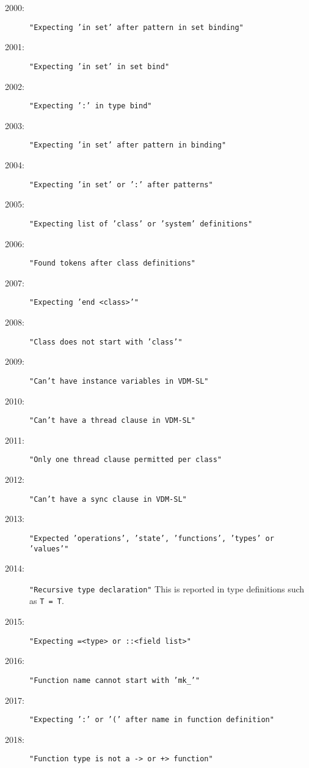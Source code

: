 %
%
%

\begin{description}
\item[2000:] \texttt{"Expecting 'in set' after pattern in set binding"}
\item[2001:] \texttt{"Expecting 'in set' in set bind"}
\item[2002:] \texttt{"Expecting ':' in type bind"}
\item[2003:] \texttt{"Expecting 'in set' after pattern in binding"}
\item[2004:] \texttt{"Expecting 'in set' or ':' after patterns"}
\item[2005:] \texttt{"Expecting list of 'class' or 'system' definitions"}
\item[2006:] \texttt{"Found tokens after class definitions"}
\item[2007:] \texttt{"Expecting 'end <class>'"}
\item[2008:] \texttt{"Class does not start with 'class'"}
\item[2009:] \texttt{"Can't have instance variables in VDM-SL"}
\item[2010:] \texttt{"Can't have a thread clause in VDM-SL"}
\item[2011:] \texttt{"Only one thread clause permitted per class"}
\item[2012:] \texttt{"Can't have a sync clause in VDM-SL"}
\item[2013:] \texttt{"Expected 'operations', 'state', 'functions', 'types' or 'values'"}
\item[2014:] \texttt{"Recursive type declaration"}  This is reported in
  type definitions such as \texttt{T = T}.
\item[2015:] \texttt{"Expecting =<type> or ::<field list>"}
\item[2016:] \texttt{"Function name cannot start with 'mk\_'"}
\item[2017:] \texttt{"Expecting ':' or '(' after name in function definition"}
\item[2018:] \texttt{"Function type is not a -> or +> function"}

\end{description}
